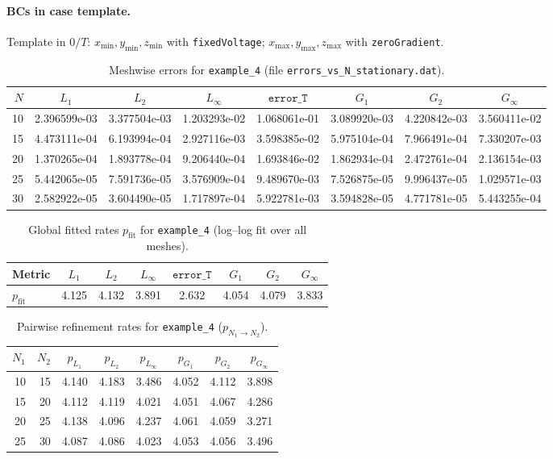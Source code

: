 \documentclass[11pt,a4paper]{article}
\begin{document}
\paragraph{BCs in case template.}
Template in $0/T$: $x_{\min},y_{\min},z_{\min}$ with \texttt{fixedVoltage}; $x_{\max},y_{\max},z_{\max}$ with \texttt{zeroGradient}.
\begin{table}[htbp]
\centering
\caption{Meshwise errors for \texttt{example\_4} (file \texttt{errors\_vs\_N\_stationary.dat}).}
\label{tab:errors-example-4}
\scriptsize
\begin{tabular}{rccccccc}
\toprule
$N$ & $L_1$ & $L_2$ & $L_\infty$ & $\texttt{error\_T}$ & $G_1$ & $G_2$ & $G_\infty$ \\
\midrule
10 & 2.396599e-03 & 3.377504e-03 & 1.203293e-02 & 1.068061e-01 & 3.089920e-03 & 4.220842e-03 & 3.560411e-02 \\
15 & 4.473111e-04 & 6.193994e-04 & 2.927116e-03 & 3.598385e-02 & 5.975104e-04 & 7.966491e-04 & 7.330207e-03 \\
20 & 1.370265e-04 & 1.893778e-04 & 9.206440e-04 & 1.693846e-02 & 1.862934e-04 & 2.472761e-04 & 2.136154e-03 \\
25 & 5.442065e-05 & 7.591736e-05 & 3.576909e-04 & 9.489670e-03 & 7.526875e-05 & 9.996437e-05 & 1.029571e-03 \\
30 & 2.582922e-05 & 3.604490e-05 & 1.717897e-04 & 5.922781e-03 & 3.594828e-05 & 4.771781e-05 & 5.443255e-04 \\
\bottomrule
\end{tabular}
\end{table}
\begin{table}[htbp]
\centering
\caption{Global fitted rates $p_{\mathrm{fit}}$ for \texttt{example\_4} (log--log fit over all meshes).}
\label{tab:fit-example-4}
\small
\begin{tabular}{lccccccc}
\toprule
Metric & $L_1$ & $L_2$ & $L_\infty$ & $\texttt{error\_T}$ & $G_1$ & $G_2$ & $G_\infty$ \\
\midrule
$p_{\mathrm{fit}}$ & 4.125 & 4.132 & 3.891 & 2.632 & 4.054 & 4.079 & 3.833 \\
\bottomrule
\end{tabular}
\end{table}
\begin{table}[htbp]
\centering
\caption{Pairwise refinement rates for \texttt{example\_4} ($p_{N_1\to N_2}$).}
\label{tab:pair-example-4}
\scriptsize
\begin{tabular}{rrcccccc}
\toprule
$N_1$ & $N_2$ & $p_{L_1}$ & $p_{L_2}$ & $p_{L_\infty}$ & $p_{G_1}$ & $p_{G_2}$ & $p_{G_\infty}$ \\
\midrule
10 & 15 & 4.140 & 4.183 & 3.486 & 4.052 & 4.112 & 3.898 \\
15 & 20 & 4.112 & 4.119 & 4.021 & 4.051 & 4.067 & 4.286 \\
20 & 25 & 4.138 & 4.096 & 4.237 & 4.061 & 4.059 & 3.271 \\
25 & 30 & 4.087 & 4.086 & 4.023 & 4.053 & 4.056 & 3.496 \\
\bottomrule
\end{tabular}
\end{table}
\end{document}
